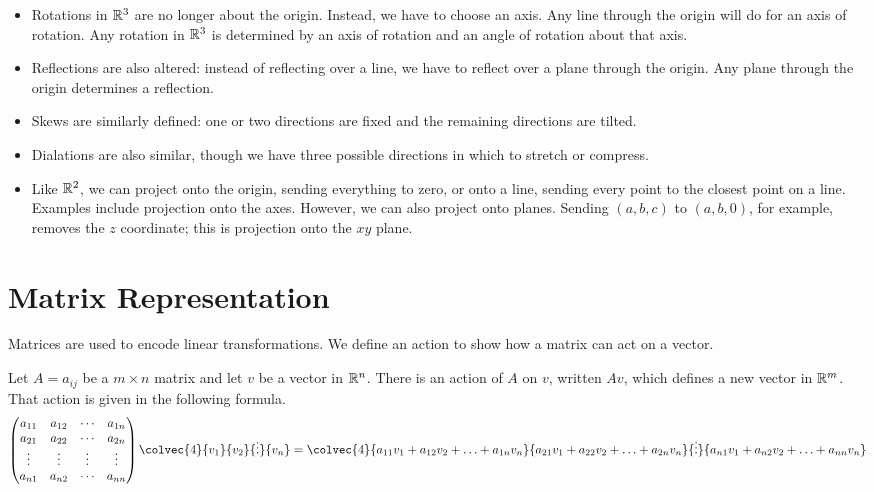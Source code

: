 \documentclass[fleqn,letterpaper]{report}
\begin{document}
\begin{itemize}
\item Rotations in $\mathbb{R}^3$ are no longer about the origin.
Instead, we have to choose an axis. Any line through the origin
will do for an axis of rotation. Any rotation in $\mathbb{R}^3$ is
determined by an axis of rotation and an angle of rotation about
that axis.
\item Reflections are also altered: instead of reflecting over a
line, we have to reflect over a plane through the origin. Any
plane through the origin determines a reflection.
\item Skews are similarly defined: one or two directions are
fixed and the remaining directions are tilted.
\item Dialations are also similar, though we have three possible
directions in which to stretch or compress.
\item Like $\mathbb{R}^2$, we can project onto the origin, sending
everything to zero, or onto a line, sending every point to the
closest point on a line. Examples include projection
onto the axes. However, we can also project onto planes.
Sending $(a,b,c)$ to $(a,b,0)$, for example, removes the $z$
coordinate; this is projection onto the $xy$ plane.
\end{itemize}

\section{Matrix Representation}
\label{matrix-representation}

Matrices are used to encode linear transformations. We define
an action to show how a matrix can act on a vector.

\begin{defn}
Let $A = a_{ij}$ be a $m \times n$ matrix and let $v$ be a vector in
$\mathbb{R}^n$. There is an action of $A$ on $v$, written
$Av$, which defines a new vector in $\mathbb{R}^m$. That action is
given in the following formula.
\begin{displaymath}
\left( 
\begin{matrix}
a_{11} & a_{12} & \cdots & a_{1n} \\
a_{21} & a_{22} & \cdots & a_{2n} \\
\vdots & \vdots & \vdots & \vdots \\
a_{n1} & a_{n2} & \cdots & a_{nn} 
\end{matrix}
\right)
\colvec{4}{v_1}{v_2}{\vdots}{v_n}
= 
\colvec{4}
{a_{11}v_1 + a_{12}v_2 + \ldots + a_{1n}v_n} 
{a_{21}v_1 + a_{22}v_2 + \ldots + a_{2n}v_n} 
{\vdots}
{a_{n1}v_1 + a_{n2}v_2 + \ldots + a_{nn}v_n} 
\end{displaymath}
\end{defn}
\end{document}
